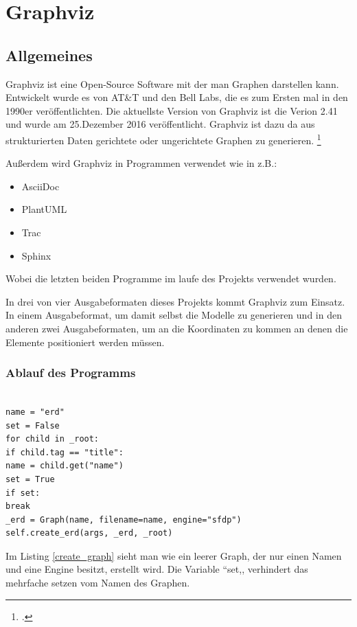 \section{Graphviz}
\fib{}
\subsection{Allgemeines}

\noindent
Graphviz ist eine Open-Source Software mit der man Graphen darstellen kann.
Entwickelt wurde es von AT\&T und den Bell Labs, die es zum Ersten mal in den 1990er veröffentlichten. Die aktuellste Version von Graphviz ist die Verion 2.41 und wurde am 25.Dezember 2016 veröffentlicht. Graphviz ist dazu da aus strukturierten Daten gerichtete oder ungerichtete Graphen zu generieren. 
\footcite{graphviz_nodate}

\noindent
Außerdem wird Graphviz in Programmen verwendet wie in z.B.:
\begin{itemize}
	\item AsciiDoc
	\item PlantUML
	\item Trac
	\item Sphinx
\end{itemize}
\noindent
Wobei die letzten beiden Programme im laufe des Projekts verwendet wurden.

\noindent
In drei von vier Ausgabeformaten dieses Projekts kommt Graphviz zum Einsatz. In einem Ausgabeformat, um damit selbst die Modelle zu generieren und in den anderen zwei Ausgabeformaten, um an die Koordinaten zu kommen an denen die Elemente positioniert werden müssen.

\subsubsection{Ablauf des Programms}

\noindent
\lstset{language=Python}
\lstset{frame=lines}
\lstset{basicstyle=\footnotesize}
\begin{lstlisting}

name = "erd"
set = False
for child in _root:
if child.tag == "title":
name = child.get("name")
set = True
if set:
break
_erd = Graph(name, filename=name, engine="sfdp")
self.create_erd(args, _erd, _root)

\end{lstlisting}
\noindent
Im Listing \ref{create_graph} sieht man wie ein leerer Graph, der nur einen Namen und eine Engine besitzt, erstellt wird. 
Die Variable ``set,, verhindert das mehrfache setzen vom Namen des Graphen. 

